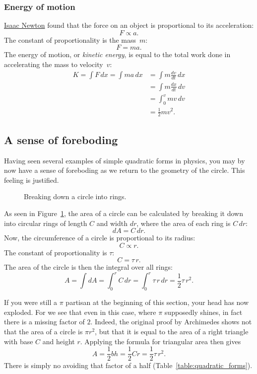 {    \subsubsection{Energy of motion} %
    \label{sec:energy_of_motion}

\href{https://en.wikipedia.org/wiki/Isaac_Newton}{Isaac Newton} found that the force on an object is proportional to its acceleration:
\[ F \propto a. \]
The constant of proportionality is the mass~$m$:
\[ F = m a. \]
The energy of motion, or \emph{kinetic energy}, is equal to the total work done in accelerating the mass to velocity~$v$:
\[
\begin{split}
K = \int F\,dx = \int ma\,dx & = \int m\frac{dv}{dt}\,dx \\ & = \int m\frac{dx}{dt}\,dv \\ & = \int_0^v mv\,dv \\ & = \textstyle{\frac{1}{2}} mv^2.
\end{split}
\]

  \subsection{A sense of foreboding} %
  \label{sec:a_sense_of_foreboding}

Having seen several examples of simple quadratic forms in physics, you may by now have a sense of foreboding as we return to the geometry of the circle. This feeling is justified.

\begin{figure}
\begin{center}
\end{center}
\caption{Breaking down a circle into rings.\label{fig:circular_area}}
\end{figure}


As seen in Figure~\ref{fig:circular_area}, the area of a circle can be calculated by breaking it down into circular rings of length $C$ and width $dr$, where the area of each ring is $C\,dr$:
\[ dA = C\,dr. \]
Now, the circumference of a circle is proportional to its radius:
\[ C \propto r. \]
The constant of proportionality is $\tau$:
\[ C = \tau\,r. \]
The area of the circle is then the integral over all rings:
\[ A = \int dA = \int_0^r C\,dr = \int_0^r \tau\,r\,dr = \textstyle{\frac{1}{2}} \tau\,r^2. \]

If you were still a $\pi$ partisan at the beginning of this section, your head has now exploded. For we see that even in this case, where $\pi$ supposedly shines, in fact there is a missing factor of $2$. Indeed, the original proof by Archimedes shows not that the area  of a circle is $\pi r^2$, but that it is equal to the area of a right triangle with base $C$ and height $r$. Applying the formula for triangular area then gives
\[
  A = \textstyle{\frac{1}{2}} bh = \textstyle{\frac{1}{2}}Cr = \textstyle{\frac{1}{2}}\tau\,r^2.
\]
There is simply no avoiding that factor of a half (Table~\ref{table:quadratic_forms}).

}
